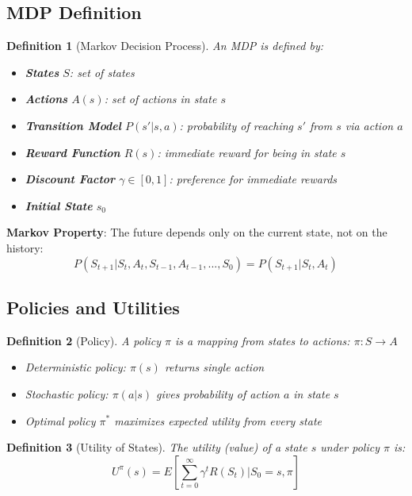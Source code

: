\documentclass[11pt,letterpaper]{article}
\newtheorem{definition}{Definition}[section]
\begin{document}
\subsection{MDP Definition}

\begin{definition}[Markov Decision Process]
An MDP is defined by:
\begin{itemize}
    \item \textbf{States} $S$: set of states
    \item \textbf{Actions} $A(s)$: set of actions in state $s$
    \item \textbf{Transition Model} $P(s'|s,a)$: probability of reaching $s'$ from $s$ via action $a$
    \item \textbf{Reward Function} $R(s)$: immediate reward for being in state $s$
    \item \textbf{Discount Factor} $\gamma \in [0,1]$: preference for immediate rewards
    \item \textbf{Initial State} $s_0$
\end{itemize}
\end{definition}

\begin{important}
\textbf{Markov Property}: The future depends only on the current state, not on the history:
$$P(S_{t+1}|S_t, A_t, S_{t-1}, A_{t-1}, ..., S_0) = P(S_{t+1}|S_t, A_t)$$
\end{important}

\subsection{Policies and Utilities}

\begin{definition}[Policy]
A policy $\pi$ is a mapping from states to actions: $\pi: S \rightarrow A$
\begin{itemize}
    \item Deterministic policy: $\pi(s)$ returns single action
    \item Stochastic policy: $\pi(a|s)$ gives probability of action $a$ in state $s$
    \item Optimal policy $\pi^*$ maximizes expected utility from every state
\end{itemize}
\end{definition}

\begin{definition}[Utility of States]
The utility (value) of a state $s$ under policy $\pi$ is:
$$U^\pi(s) = E\left[\sum_{t=0}^{\infty} \gamma^t R(S_t) \Big| S_0 = s, \pi\right]$$
\end{definition}
\end{document}
